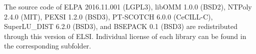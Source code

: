 \documentclass{report}
\begin{document}
The source code of ELPA 2016.11.001 (LGPL3), libOMM 1.0.0 (BSD2), NTPoly 2.4.0 (MIT), PEXSI 1.2.0 (BSD3), PT-SCOTCH 6.0.0 (CeCILL-C), SuperLU\_DIST 6.2.0 (BSD3), and BSEPACK 0.1 (BSD3) are redistributed through this version of ELSI. Individual license of each library can be found in the corresponding subfolder.
\end{document}
